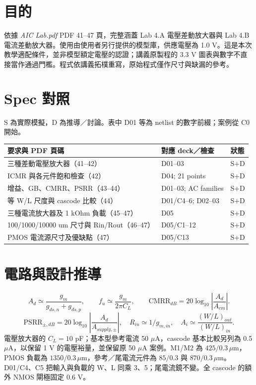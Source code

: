 \section{目的}
依據 \textit{AIC Lab.pdf} PDF 41--47 頁，完整涵蓋 Lab 4.A 電壓差動放大器與 Lab 4.B 電流差動放大器。使用由使用者另行提供的模型庫，供應電壓為 1.0 V。這是本次教學適配條件，並非模型額定電壓的認證；講義原製程的 3.3 V 圖表與數字不直接當作通過門檻。程式依講義拓樸重寫，原始程式僅作尺寸與缺漏的參考。

\section{Spec 對照}
S 為實際模擬，D 為推導／討論。表中 D01 等為 netlist 的數字前綴；案例從 C0 開始。
\small\begin{longtable}{p{.46\linewidth}p{.30\linewidth}p{.15\linewidth}}\toprule
要求與 PDF 頁碼 & 對應 deck／檢查 & 狀態 \\ \midrule\endhead
三種差動電壓放大器（41--42） & D01--03 & S+D \\
ICMR 與各元件飽和檢查（42） & D04; 21 points & S+D \\
增益、GB、CMRR、PSRR（43--44） & D01--03; AC families & S+D \\
等 W/L 尺度與 cascode 比較（44） & D01/C4--6; D02--03 & S+D \\
三種電流放大器及 1 kOhm 負載（45--47） & D05 & S+D \\
100/1000/10000 um 尺寸與 Rin/Rout（46--47） & D05/C1--12 & S+D \\
PMOS 電流源尺寸及優缺點（47） & D05/C13 & S+D \\
\bottomrule\end{longtable}\normalsize


\section{電路與設計推導}
\[
 A_d\simeq\frac{g_m}{g_{ds,n}+g_{ds,p}},\qquad
 f_u\simeq\frac{g_m}{2\pi C_L},\qquad
 \mathrm{CMRR}_{dB}=20\log_{10}\left|\frac{A_d}{A_{cm}}\right|.
 \]
 \[
 \mathrm{PSRR}_{\pm,dB}=20\log_{10}\left|\frac{A_d}{A_{supply,\pm}}\right|,
 \quad R_{in}\simeq1/g_{m,in},\quad A_i\simeq\frac{(W/L)_{out}}{(W/L)_{in}}.
 \]電壓放大器的 $C_L=10$ pF；基本型參考電流 50 $\mu$A，cascode 基本比較另列為 0.5 $\mu$A，以保留 1 V 的電壓裕量，並保留原 50 $\mu$A 案例。M1/M2 為 $425/0.3\,\mu$m，PMOS 負載為 $1350/0.3\,\mu$m，參考／尾電流元件為 $85/0.3$ 與 $870/0.3\,\mu$m。D01/C4、C5 把輸入與負載的 W、L 同乘 3、5；尾電流鏡不變。全 cascode 的額外 NMOS 閘極固定 0.6 V。

